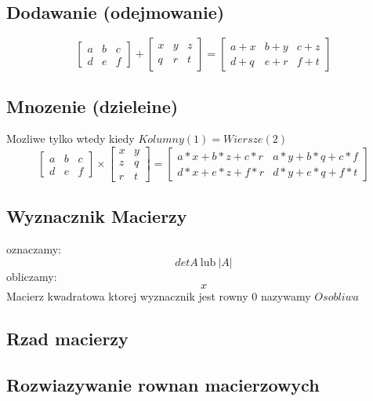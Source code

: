 \documentclass[a4paper]{article}
\begin{document}
\subsection{Dodawanie (odejmowanie)}
\begin{equation}
    \begin{bmatrix}
        a & b & c\\
        d & e & f
        \end{bmatrix} +
        \begin{bmatrix}
            x & y & z \\
            q & r & t
        \end{bmatrix} =
        \begin{bmatrix}
            a+x & b+y & c +z \\
            d+q & e+r & f+t
        \end{bmatrix}
\end{equation}

\subsection{Mnozenie (dzieleine)}
Mozliwe tylko wtedy kiedy $Kolumny (1) = Wiersze(2)$
\begin{equation*}
    \begin{bmatrix}
        a & b & c\\
        d & e & f
        \end{bmatrix} \times
        \begin{bmatrix}
            x & y \\
            z & q \\
            r & t
        \end{bmatrix} =
        \begin{bmatrix}
            a*x + b*z + c *r & a*y + b * q + c * f  \\
            d*x + e * z + f *r & d* y + e * q + f*t
        \end{bmatrix}
\end{equation*}
\subsection{Wyznacznik Macierzy}
oznaczamy:
\begin{equation}
    det A \ \text{lub} \ |A|
\end{equation}
obliczamy:
\begin{equation}
    x
\end{equation}
Macierz kwadratowa ktorej wyznacznik jest rowny $ 0 $ nazywamy $Osobliwa$
\subsection{Rzad macierzy}
\subsection{Rozwiazywanie rownan macierzowych}
\end{document}
